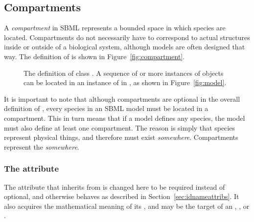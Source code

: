 \subsection{Compartments}
\label{sec:compartments}

A \emph{compartment} in SBML represents a bounded space in which
species are located.  Compartments do not necessarily have to
correspond to actual structures inside or outside of a biological
system, although models are often designed that way.  The definition
of \Compartment is shown in Figure~\vref{fig:compartment}.

\begin{figure}[htb]
  \centering
  \small
  \caption{The definition of class \Compartment.  A
      sequence of  or more instances of \Compartment objects
      can be located in an instance of \ListOfCompartments in
      \Model, as shown in Figure~\protect\ref{fig:model}.}
  \label{fig:compartment}
\end{figure}

It is important to note that although compartments are optional in
the overall definition of \Model, every species in an SBML model
must be located in a compartment.  This in turn means that if a
model defines any species, the model must also define at least one
compartment.  The reason is simply that species represent physical
things, and therefore must exist \emph{somewhere}.  Compartments
represent the \emph{somewhere}.


\begin{blockChanged}
\subsubsection{The  attribute}

The  attribute that \Compartment inherits from \SBase is changed here to be required instead of optional, and otherwise behaves as described in Section~\ref{sec:idnameattribs}.  It also acquires the mathematical meaning of its , and may be the target of an \InitialAssignment, \EventAssignment, or \Rule.
\end{blockChanged}

